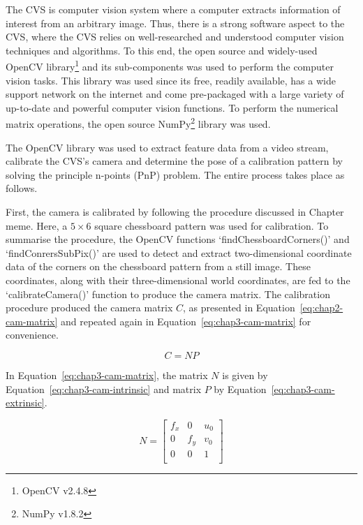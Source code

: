 The CVS is computer vision system where a computer extracts information of interest from an arbitrary image. Thus, there is a strong software aspect to the CVS, where the CVS relies on well-researched and understood computer vision techniques and algorithms. To this end, the open source and widely-used OpenCV library\footnote{OpenCV v2.4.8} and its sub-components was used to perform the computer vision tasks. This library was used since its free, readily available, has a wide support network on the internet and come pre-packaged with a large variety of up-to-date and powerful computer vision functions. To perform the numerical matrix operations, the open source NumPy\footnote{NumPy v1.8.2} library was used. 

The OpenCV library was used to extract feature data from a video stream, calibrate the CVS's camera and determine the pose of a calibration pattern by solving the principle n-points (PnP) problem. The entire process takes place as follows. 

First, the camera is calibrated by following the procedure discussed in Chapter meme. Here, a $5\times6$ square chessboard pattern was used for calibration. To summarise the procedure, the OpenCV functions `findChessboardCorners()' and `findConrersSubPix()' are used to detect and extract two-dimensional coordinate data of the corners on the chessboard pattern from a still image. These coordinates, along with their three-dimensional world coordinates, are fed to the `calibrateCamera()' function to produce the camera matrix. The calibration procedure produced the camera matrix $C$, as presented in Equation~\ref{eq:chap2-cam-matrix} and repeated again in Equation~\ref{eq:chap3-cam-matrix} for convenience. 

\begin{equation}
  \label{eq:chap3-cam-matrix}
  C = 
  NP
\end{equation}

In Equation~\ref{eq:chap3-cam-matrix}, the matrix $N$ is given by Equation~\ref{eq:chap3-cam-intrinsic} and matrix $P$ by Equation~\ref{eq:chap3-cam-extrinsic}.

\begin{equation}
  \label{eq:chap3-cam-intrinsic}
  N = 
  \begin{bmatrix}
    f_x & 0   & u_0 \\
    0   & f_y & v_0 \\
    0   & 0   & 1   \\
  \end{bmatrix}
\end{equation}

